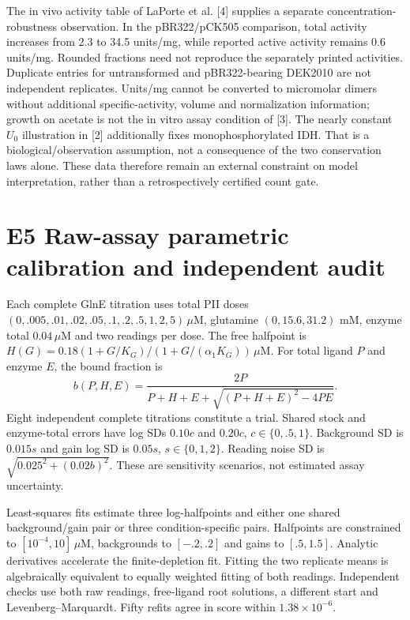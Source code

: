 \documentclass[11pt]{article}
\begin{document}
The in vivo activity table of LaPorte et al. [4] supplies a separate concentration-robustness observation. In the pBR322/pCK505 comparison, total activity increases from 2.3 to 34.5 units/mg, while reported active activity remains 0.6 units/mg. Rounded fractions need not reproduce the separately printed activities. Duplicate entries for untransformed and pBR322-bearing DEK2010 are not independent replicates. Units/mg cannot be converted to micromolar dimers without additional specific-activity, volume and normalization information; growth on acetate is not the in vitro assay condition of [3]. The nearly constant $U_0$ illustration in [2] additionally fixes monophosphorylated IDH. That is a biological/observation assumption, not a consequence of the two conservation laws alone. These data therefore remain an external constraint on model interpretation, rather than a retrospectively certified count gate.

\section*{E5 Raw-assay parametric calibration and independent audit}
Each complete GlnE titration uses total PII doses $(0,.005,.01,.02,.05,.1,.2,.5,1,2,5)\,\mu$M, glutamine $(0,15.6,31.2)$ mM, enzyme total $0.04\,\mu$M and two readings per dose. The free halfpoint is $H(G)=0.18(1+G/K_G)/(1+G/(\alpha_1K_G))\,\mu$M. For total ligand $P$ and enzyme $E$, the bound fraction is
\begin{equation}
 b(P,H,E)=\frac{2P}{P+H+E+\sqrt{(P+H+E)^2-4PE}}.
\end{equation}
Eight independent complete titrations constitute a trial. Shared stock and enzyme-total errors have log SDs $0.10c$ and $0.20c$, $c\in\{0,.5,1\}$. Background SD is $0.015s$ and gain log SD is $0.05s$, $s\in\{0,1,2\}$. Reading noise SD is $\sqrt{0.025^2+(0.02b)^2}$. These are sensitivity scenarios, not estimated assay uncertainty.

Least-squares fits estimate three log-halfpoints and either one shared background/gain pair or three condition-specific pairs. Halfpoints are constrained to $[10^{-4},10]\,\mu$M, backgrounds to $[-.2,.2]$ and gains to $[.5,1.5]$. Analytic derivatives accelerate the finite-depletion fit. Fitting the two replicate means is algebraically equivalent to equally weighted fitting of both readings. Independent checks use both raw readings, free-ligand root solutions, a different start and Levenberg--Marquardt. Fifty refits agree in score within $1.38\times10^{-6}$.
\end{document}

